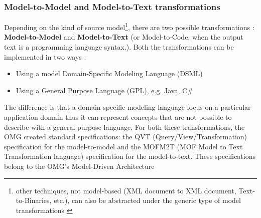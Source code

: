 \subsubsection{Model-to-Model and Model-to-Text transformations}
\label{m2m&m2t}
Depending on the kind of source model\footnote{other techniques, not model-based (XML document to XML document, Text-to-Binaries, etc.), can also be abstracted under the generic type of model transformations \cite{M2TandM2M}}, there are two possible transformations \cite{Papa11}: \textbf{Model-to-Model} and \textbf{Model-to-Text} (or Model-to-Code, when the output text is a programming language syntax.). Both the transformations can be implemented in two ways \cite{M2TandM2M}:
\begin{itemize}
 \item Using a model Domain-Specific Modeling Language (DSML)
 \item Using a General Purpose Language (GPL), e.g. Java, C\#
\end{itemize}
The difference is that a domain specific modeling language focus on a particular application domain thus it can represent concepts that are not possible to describe with a general purpose language.
For both these transformations, the OMG created standard specifications: the QVT (Query/View/Transformation) specification for the model-to-model and the MOFM2T (MOF Model to Text Transformation language) specification for the model-to-text. These specifications belong to the OMG's Model-Driven Architecture


